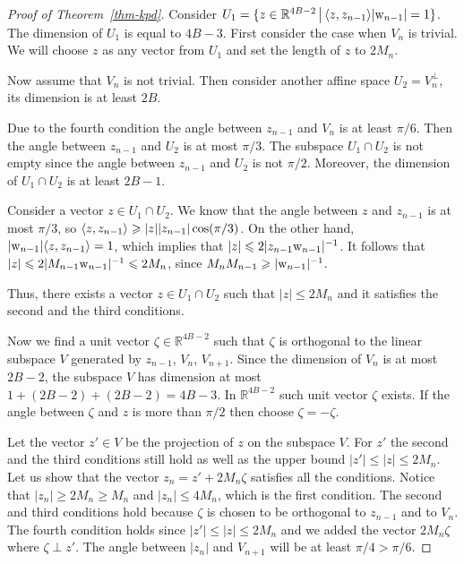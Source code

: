 \documentclass[12pt,oneside,a4paper]{amsart}
\begin{document}
\begin{proof}[Proof of Theorem~\ref{thm-kpd}]
        Consider $U_1 = \{z \in \mathbb{R}^{4B-2}\, \big| \, \langle z, z_{n-1} \rangle\lvert\mathrm{w}_{n-1}\rvert  = 1\}$.
        The dimension of $U_1$ is equal to $4B - 3$.
        First consider the case when $V_n$ is trivial. We will choose $z$ as any vector from $U_1$
          and set the length of $z$ to $2 M_n$.

        Now assume that $V_n$ is not trivial.
        Then consider another affine space $U_2 = V_n^\bot$, its dimension is at least $2B$.

        Due to the fourth condition the angle between $z_{n - 1}$ and $V_n$ is at least $\pi / 6$.
        Then the angle between $z_{n - 1}$ and $U_2$ is at most $\pi / 3$.
        The subspace $U_1 \cap U_2$ is not empty since the angle between $z_{n-1}$ and $U_2$ is not $\pi / 2$.
        Moreover, the dimension of $U_1 \cap U_2$ is at least $2B - 1$.

        Consider a vector $z \in U_1 \cap U_2$.
        We know that the angle between $z$ and $z_{n-1}$ is at most $\pi / 3$,
          so $\langle z, z_{n-1} \rangle \geqslant \lvert z \rvert \lvert z_{n-1}\rvert  \cos(\pi / 3)$.
        On the other hand, $\lvert\mathrm{w}_{n-1}\rvert \langle z, z_{n-1} \rangle = 1$, which implies
          that $\lvert z\rvert \leqslant 2 \lvert z_{n-1} \mathrm{w}_{n-1}\rvert^{-1}$.
        It follows that $\lvert z\rvert \leqslant 2 \lvert  M_{n-1} \mathrm{w}_{n-1}\rvert^{-1}
          \leqslant 2 M_n$, since $M_n M_{n-1} \geqslant \lvert \mathrm{w}_{n-1} \rvert^{-1}$.

        Thus, there exists a vector $z \in U_1 \cap U_2$ such that $\lvert z\rvert \leq 2 M_n$ and
          it satisfies the second and the third conditions.

        Now we find a unit vector $\zeta \in \mathbb{R}^{4B - 2}$
          such that $\zeta$ is orthogonal to the linear subspace $V$ generated by
          $z_{n-1}$, $V_{n}$, $V_{n + 1}$.
        Since the dimension of $V_n$ is at most $2B - 2$,
          the subspace $V$ has dimension at most $1 + (2B - 2) + (2B - 2) = 4B - 3$.
        In $\mathbb{R}^{4B - 2}$ such unit vector $\zeta$ exists.
        If the angle between $\zeta$ and $z$ is more than $\pi/2$ then choose $\zeta = -\zeta$.

        Let the vector $z' \in V$ be the projection of $z$ on the subspace $V$.
        For $z'$ the second and the third conditions still hold as well as the upper bound
          $\lvert z'\rvert \leq \lvert z\rvert \leq 2 M_n$.
        Let us show that the vector $z_n = z' + 2 M_n \zeta$ satisfies all the conditions.
        Notice that $\lvert z_n \rvert \geq 2 M_n \geq M_n$ and $\lvert z_n \rvert \leq 4 M_n$,
          which is the first condition.
        The second and third conditions hold because $\zeta$ is chosen to be orthogonal to $z_{n - 1}$ and to $V_n$.
        The fourth condition holds since $\lvert z'\rvert \leq \lvert z \rvert \leq 2 M_n$ and we added the vector $2M_n \zeta$
          where $\zeta \perp z'$.
        The angle between $\lvert z_n\rvert$ and $V_{n+1}$ will be at least $\pi / 4 > \pi / 6$.


\end{proof}
\end{document}

